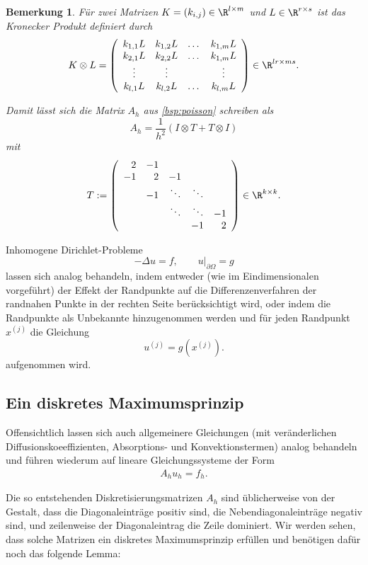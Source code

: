 \documentclass[
]{mycourse}
\theoremstyle{mythm}
\newtheorem{bemerkung}[theorem]{Bemerkung}
\theoremstyle{break}
\begin{document}
\begin{bemerkung}
Für zwei Matrizen $K=(k_{i,j})\in \R^{l \times m}$ und $L\in \R^{r \times s}$ ist das \emph{Kronecker Produkt} definiert durch
\[
K\otimes L =  \left( \begin{array}{c c c c} k_{1,1} L & k_{1,2}L & \dots & k_{1,m}L \\ k_{2,1} L & k_{2,2}L & \dots & k_{1,m}L \\ \vdots & \vdots & & \vdots\\
k_{l,1} L & k_{l,2}L & \dots & k_{l,m}L\end{array} \right) \in \R^{lr\times ms}.
\]

Damit lässt sich die Matrix $A_h$ aus \ref{bsp:poisson} schreiben als
\[
A_h=\frac{1}{h^2} \left( I \otimes T + T \otimes I \right)
\]
mit
\[
T:=\left( \begin{array}{r r r r r} 2 & -1\\ -1 & 2 & -1\\ & -1 & \ddots & \ddots\\ & & \ddots & \ddots & -1\\ & & & -1 & 2\end{array}\right)\in \R^{k\times k}.
\]
\end{bemerkung}

Inhomogene Dirichlet-Probleme
\[
-\Delta u =f, \qquad u|_{\partial \Omega}=g
\]
lassen sich analog behandeln, indem entweder (wie im Eindimensionalen vorgeführt) der Effekt der Randpunkte auf die Differenzenverfahren der randnahen Punkte  
in der rechten Seite berücksichtigt wird, oder indem die Randpunkte als Unbekannte hinzugenommen werden und für jeden Randpunkt $x^{(j)}$
die Gleichung
\[
u^{(j)}=g(x^{(j)}).
\]
aufgenommen wird.


\subsection{Ein diskretes Maximumsprinzip}

Offensichtlich lassen sich auch allgemeinere Gleichungen (mit veränderlichen Diffusionskoeeffizienten, Absorptions- und Konvektionstermen)
analog behandeln und führen wiederum auf lineare Gleichungssysteme der Form
\begin{align*}
A_h u_h =f_h.
\end{align*}

Die so entstehenden Diskretisierungsmatrizen $A_h$ sind üblicherweise von der Gestalt, dass die Diagonaleinträge positiv sind, die Nebendiagonaleinträge
negativ sind, und zeilenweise der Diagonaleintrag die Zeile dominiert. 
Wir werden sehen, dass solche Matrizen ein diskretes Maximumsprinzip erfüllen und benötigen dafür noch das folgende Lemma:
\end{document}

